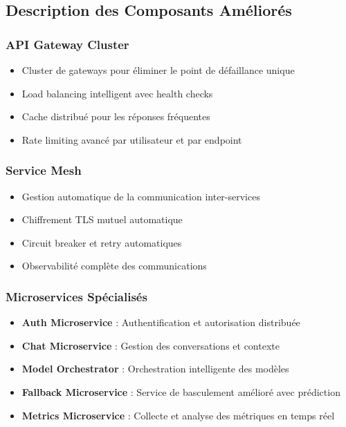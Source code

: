 \documentclass[12pt,a4paper]{article}
\begin{document}
\subsection{Description des Composants Améliorés}

\subsubsection{API Gateway Cluster}
\begin{itemize}
    \item Cluster de gateways pour éliminer le point de défaillance unique
    \item Load balancing intelligent avec health checks
    \item Cache distribué pour les réponses fréquentes
    \item Rate limiting avancé par utilisateur et par endpoint
\end{itemize}

\subsubsection{Service Mesh}
\begin{itemize}
    \item Gestion automatique de la communication inter-services
    \item Chiffrement TLS mutuel automatique
    \item Circuit breaker et retry automatiques
    \item Observabilité complète des communications
\end{itemize}

\subsubsection{Microservices Spécialisés}
\begin{itemize}
    \item \textbf{Auth Microservice} : Authentification et autorisation distribuée
    \item \textbf{Chat Microservice} : Gestion des conversations et contexte
    \item \textbf{Model Orchestrator} : Orchestration intelligente des modèles
    \item \textbf{Fallback Microservice} : Service de basculement amélioré avec prédiction
    \item \textbf{Metrics Microservice} : Collecte et analyse des métriques en temps réel
\end{itemize}
\end{document}
